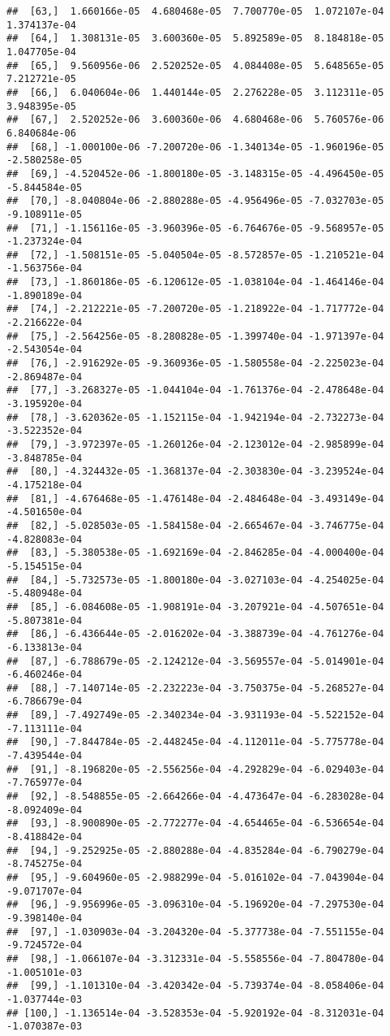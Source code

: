 \documentclass[
]{article}
\begin{document}
\begin{verbatim}
##  [63,]  1.660166e-05  4.680468e-05  7.700770e-05  1.072107e-04  1.374137e-04
##  [64,]  1.308131e-05  3.600360e-05  5.892589e-05  8.184818e-05  1.047705e-04
##  [65,]  9.560956e-06  2.520252e-05  4.084408e-05  5.648565e-05  7.212721e-05
##  [66,]  6.040604e-06  1.440144e-05  2.276228e-05  3.112311e-05  3.948395e-05
##  [67,]  2.520252e-06  3.600360e-06  4.680468e-06  5.760576e-06  6.840684e-06
##  [68,] -1.000100e-06 -7.200720e-06 -1.340134e-05 -1.960196e-05 -2.580258e-05
##  [69,] -4.520452e-06 -1.800180e-05 -3.148315e-05 -4.496450e-05 -5.844584e-05
##  [70,] -8.040804e-06 -2.880288e-05 -4.956496e-05 -7.032703e-05 -9.108911e-05
##  [71,] -1.156116e-05 -3.960396e-05 -6.764676e-05 -9.568957e-05 -1.237324e-04
##  [72,] -1.508151e-05 -5.040504e-05 -8.572857e-05 -1.210521e-04 -1.563756e-04
##  [73,] -1.860186e-05 -6.120612e-05 -1.038104e-04 -1.464146e-04 -1.890189e-04
##  [74,] -2.212221e-05 -7.200720e-05 -1.218922e-04 -1.717772e-04 -2.216622e-04
##  [75,] -2.564256e-05 -8.280828e-05 -1.399740e-04 -1.971397e-04 -2.543054e-04
##  [76,] -2.916292e-05 -9.360936e-05 -1.580558e-04 -2.225023e-04 -2.869487e-04
##  [77,] -3.268327e-05 -1.044104e-04 -1.761376e-04 -2.478648e-04 -3.195920e-04
##  [78,] -3.620362e-05 -1.152115e-04 -1.942194e-04 -2.732273e-04 -3.522352e-04
##  [79,] -3.972397e-05 -1.260126e-04 -2.123012e-04 -2.985899e-04 -3.848785e-04
##  [80,] -4.324432e-05 -1.368137e-04 -2.303830e-04 -3.239524e-04 -4.175218e-04
##  [81,] -4.676468e-05 -1.476148e-04 -2.484648e-04 -3.493149e-04 -4.501650e-04
##  [82,] -5.028503e-05 -1.584158e-04 -2.665467e-04 -3.746775e-04 -4.828083e-04
##  [83,] -5.380538e-05 -1.692169e-04 -2.846285e-04 -4.000400e-04 -5.154515e-04
##  [84,] -5.732573e-05 -1.800180e-04 -3.027103e-04 -4.254025e-04 -5.480948e-04
##  [85,] -6.084608e-05 -1.908191e-04 -3.207921e-04 -4.507651e-04 -5.807381e-04
##  [86,] -6.436644e-05 -2.016202e-04 -3.388739e-04 -4.761276e-04 -6.133813e-04
##  [87,] -6.788679e-05 -2.124212e-04 -3.569557e-04 -5.014901e-04 -6.460246e-04
##  [88,] -7.140714e-05 -2.232223e-04 -3.750375e-04 -5.268527e-04 -6.786679e-04
##  [89,] -7.492749e-05 -2.340234e-04 -3.931193e-04 -5.522152e-04 -7.113111e-04
##  [90,] -7.844784e-05 -2.448245e-04 -4.112011e-04 -5.775778e-04 -7.439544e-04
##  [91,] -8.196820e-05 -2.556256e-04 -4.292829e-04 -6.029403e-04 -7.765977e-04
##  [92,] -8.548855e-05 -2.664266e-04 -4.473647e-04 -6.283028e-04 -8.092409e-04
##  [93,] -8.900890e-05 -2.772277e-04 -4.654465e-04 -6.536654e-04 -8.418842e-04
##  [94,] -9.252925e-05 -2.880288e-04 -4.835284e-04 -6.790279e-04 -8.745275e-04
##  [95,] -9.604960e-05 -2.988299e-04 -5.016102e-04 -7.043904e-04 -9.071707e-04
##  [96,] -9.956996e-05 -3.096310e-04 -5.196920e-04 -7.297530e-04 -9.398140e-04
##  [97,] -1.030903e-04 -3.204320e-04 -5.377738e-04 -7.551155e-04 -9.724572e-04
##  [98,] -1.066107e-04 -3.312331e-04 -5.558556e-04 -7.804780e-04 -1.005101e-03
##  [99,] -1.101310e-04 -3.420342e-04 -5.739374e-04 -8.058406e-04 -1.037744e-03
## [100,] -1.136514e-04 -3.528353e-04 -5.920192e-04 -8.312031e-04 -1.070387e-03
\end{verbatim}
\end{document}
